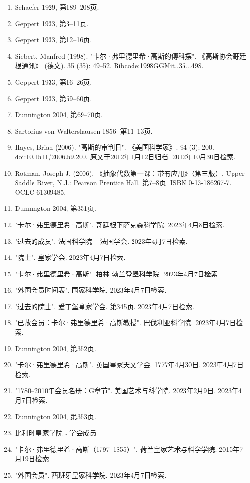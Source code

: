\begin{enumerate}
\item Schaefer 1929, 第189–208页.  
\item Geppert 1933, 第3–11页.  
\item Geppert 1933, 第12–16页.  
\item Siebert, Manfred (1998). "卡尔·弗里德里希·高斯的傅科摆". 《高斯协会哥廷根通讯》 (德文). 35 (35): 49–52. Bibcode:1998GGMit..35...49S.  
\item Geppert 1933, 第16–26页.  
\item Geppert 1933, 第59–60页.  
\item Dunnington 2004, 第69–70页.  
\item Sartorius von Waltershausen 1856, 第11–13页.  
\item Hayes, Brian (2006). "高斯的审判日". 《美国科学家》. 94 (3): 200. doi:10.1511/2006.59.200. 原文于2012年1月12日归档. 2012年10月30日检索.  
\item Rotman, Joseph J. (2006). 《抽象代数第一课：带有应用》（第三版）. Upper Saddle River, N.J.: Pearson Prentice Hall. 第7–8页. ISBN 0-13-186267-7. OCLC 61309485.  
\item Dunnington 2004, 第351页.  
\item "卡尔·弗里德里希·高斯". 哥廷根下萨克森科学院. 2023年4月8日检索.  
\item "过去的成员". 法国科学院 – 法国学会. 2023年4月7日检索.  
\item "院士". 皇家学会. 2023年4月7日检索.  
\item "卡尔·弗里德里希·高斯". 柏林-勃兰登堡科学院. 2023年4月7日检索.  
\item "外国会员时间表". 国家科学院. 2023年4月7日检索.  
\item "过去的院士". 爱丁堡皇家学会. 第345页. 2023年4月7日检索.  
\item "已故会员：卡尔·弗里德里希·高斯教授". 巴伐利亚科学院. 2023年4月7日检索.
\item Dunnington 2004, 第352页.  
\item "卡尔·弗里德里希·高斯". 英国皇家天文学会. 1777年4月30日. 2023年4月7日检索.  
\item "1780–2010年会员名册：G章节". 美国艺术与科学院. 2023年2月9日. 2023年4月7日检索.  
\item Dunnington 2004, 第353页.  
\item 比利时皇家学院：学会成员  
\item "卡尔·弗里德里希·高斯（1797–1855）". 荷兰皇家艺术与科学学院. 2015年7月19日检索.  
\item "外国会员". 西班牙皇家科学院. 2023年4月7日检索.  

\end{enumerate}
